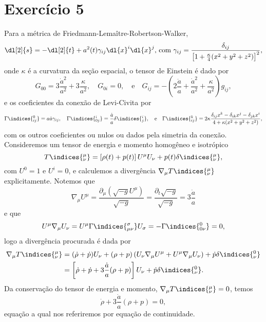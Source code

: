 \section*{Exercício 5}
Para a métrica de Friedmann-Lemaître-Robertson-Walker,
\begin{equation*}
    \dl[2]{s} = -\dl[2]{t} + a^2(t) \gamma_{ij} \dl{x}^i\dl{x}^j\text{, com }\gamma_{ij} = \frac{\delta_{ij}}{\left[1 + \frac{\kappa}4(x^2 + y^2 + z^2)\right]^2},
\end{equation*}
onde \(\kappa\) é a curvatura da seção espacial, o tensor de Einstein é dado por
\begin{equation*}
    G_{00} = 3\frac{\dot{a}^2}{a^2} + 3\frac{\kappa}{a^2},\quad
    G_{0i} = 0,\quad\text{e}\quad
    G_{ij} = - \left(2 \frac{\ddot{a}}{a} + \frac{\dot{a}^2}{a^2} + \frac{\kappa}{a^2}\right)g_{ij},
\end{equation*}
e os coeficientes da conexão de Levi-Civita por
\begin{equation*}
    \Gamma\indices{^0_{ij}} = a\dot{a} \gamma_{ij},\quad
    \Gamma\indices{^i_{0j}} = \frac{\dot{a}}{a} \delta\indices{^i_j},\quad\text{e}\quad
    \Gamma\indices{^k_{ij}} = 2\kappa \frac{\delta_{ij}x^k - \delta_{ik}x^j - \delta_{jk}x^i}{4 + \kappa(x^2 + y^2 + z^2)},
\end{equation*}
com os outros coeficientes ou nulos ou dados pela simetria da conexão. Consideremos um tensor de energia e momento homogêneo e isotrópico
\begin{equation*}
    T\indices{^\mu_\nu} = \left[\rho(t) + p(t)\right] U^\mu U_\nu + p(t) \delta\indices{^\mu_\nu},
\end{equation*}
com \(U^0 = 1\) e \(U^i = 0\), e calculemos a divergência \(\nabla_\mu T\indices{^\mu_\nu}\) explicitamente. Notemos que
\begin{equation*}
    \nabla_\mu U^\mu = \frac{\partial_\mu (\sqrt{-g}U^\mu)}{\sqrt{-g}} = \frac{\partial_t\sqrt{-g}}{\sqrt{-g}} = 3\frac{\dot{a}}{a}
\end{equation*}
e que
\begin{equation*}
    U^\mu \nabla_\mu U_\nu = U^\mu \Gamma\indices{^\sigma_{\mu\nu}} U_\sigma = - \Gamma\indices{^0_{0\nu}} = 0,
\end{equation*}
logo a divergência procurada é dada por
\begin{align*}
    \nabla_\mu T\indices{^\mu_\nu} &= (\dot{\rho} + \dot{p})U_\nu + (\rho + p) \left(U_\nu \nabla_\mu U^\mu + U^\mu \nabla_\mu U_\nu\right) + \dot{p}\delta\indices{^0_\nu}\\
                                   &= \left[\dot\rho + \dot{p} + 3\frac{\dot{a}}{a}(\rho + p)\right]U_\nu + \dot{p} \delta\indices{^0_\nu}.
\end{align*}
Da conservação do tensor de energia e momento, \(\nabla_\mu T\indices{^\mu_\nu} = 0\), temos
\begin{equation*}
    \dot{\rho} + 3\frac{\dot{a}}{a}(\rho + p) = 0,
\end{equation*}
equação a qual nos referiremos por equação de continuidade.



